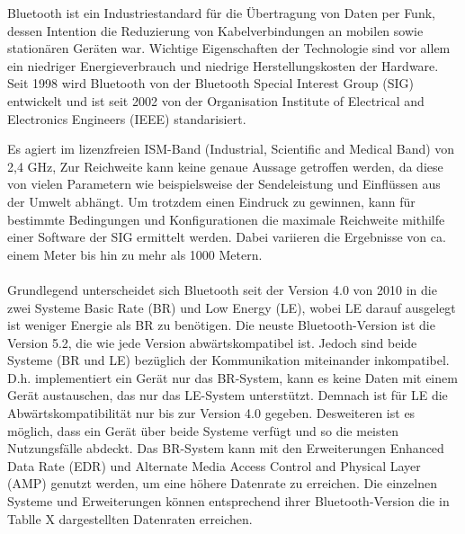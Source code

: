 Bluetooth ist ein Industriestandard für die Übertragung von Daten per Funk, dessen Intention die Reduzierung von Kabelverbindungen an mobilen sowie stationären Geräten war. Wichtige Eigenschaften der Technologie sind vor allem ein niedriger Energieverbrauch und niedrige Herstellungskosten der Hardware. Seit 1998 wird Bluetooth von der Bluetooth Special Interest Group (SIG) entwickelt und ist seit 2002 von der Organisation Institute of Electrical and Electronics Engineers (IEEE) standarisiert.

Es agiert im lizenzfreien ISM-Band (Industrial, Scientific and Medical Band) von 2,4 GHz, 
Zur Reichweite kann keine genaue Aussage getroffen werden, da diese von vielen Parametern wie beispielsweise der Sendeleistung und Einflüssen aus der Umwelt abhängt. Um trotzdem einen Eindruck zu gewinnen, kann für bestimmte Bedingungen und Konfigurationen die maximale Reichweite mithilfe einer Software der SIG ermittelt werden. Dabei variieren die Ergebnisse von ca. einem Meter bis hin zu mehr als 1000 Metern.
\\\\
Grundlegend unterscheidet sich Bluetooth seit der Version 4.0 von 2010 in die zwei Systeme Basic Rate (BR) und Low Energy (LE), wobei LE darauf ausgelegt ist weniger Energie als BR zu benötigen. Die neuste Bluetooth-Version ist die Version 5.2, die wie jede Version abwärtskompatibel ist. Jedoch sind beide Systeme (BR und LE) bezüglich der Kommunikation miteinander inkompatibel. D.h. implementiert ein Gerät nur das BR-System, kann es keine Daten mit einem Gerät austauschen, das nur das LE-System unterstützt. Demnach ist für LE die Abwärtskompatibilität nur bis zur Version 4.0 gegeben. Desweiteren ist es möglich, dass ein Gerät über beide Systeme verfügt und so die meisten Nutzungsfälle abdeckt. Das BR-System kann mit den Erweiterungen Enhanced Data Rate (EDR) und Alternate Media Access Control and Physical Layer (AMP) genutzt werden, um eine höhere Datenrate zu erreichen. Die einzelnen Systeme und Erweiterungen können entsprechend ihrer Bluetooth-Version die in Tablle X dargestellten Datenraten erreichen.\\

